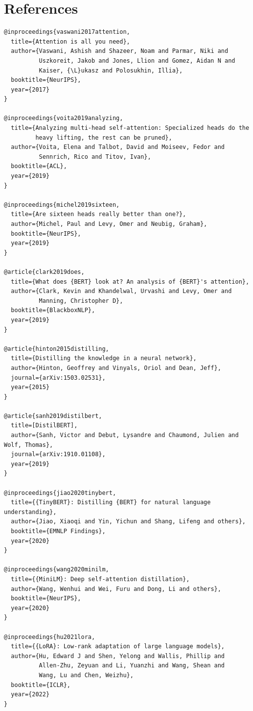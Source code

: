\section{References}

\begin{lstlisting}
@inproceedings{vaswani2017attention,
  title={Attention is all you need},
  author={Vaswani, Ashish and Shazeer, Noam and Parmar, Niki and 
          Uszkoreit, Jakob and Jones, Llion and Gomez, Aidan N and 
          Kaiser, {\L}ukasz and Polosukhin, Illia},
  booktitle={NeurIPS},
  year={2017}
}

@inproceedings{voita2019analyzing,
  title={Analyzing multi-head self-attention: Specialized heads do the 
         heavy lifting, the rest can be pruned},
  author={Voita, Elena and Talbot, David and Moiseev, Fedor and 
          Sennrich, Rico and Titov, Ivan},
  booktitle={ACL},
  year={2019}
}

@inproceedings{michel2019sixteen,
  title={Are sixteen heads really better than one?},
  author={Michel, Paul and Levy, Omer and Neubig, Graham},
  booktitle={NeurIPS},
  year={2019}
}

@article{clark2019does,
  title={What does {BERT} look at? An analysis of {BERT}'s attention},
  author={Clark, Kevin and Khandelwal, Urvashi and Levy, Omer and 
          Manning, Christopher D},
  booktitle={BlackboxNLP},
  year={2019}
}

@article{hinton2015distilling,
  title={Distilling the knowledge in a neural network},
  author={Hinton, Geoffrey and Vinyals, Oriol and Dean, Jeff},
  journal={arXiv:1503.02531},
  year={2015}
}

@article{sanh2019distilbert,
  title=[DistilBERT],
  author={Sanh, Victor and Debut, Lysandre and Chaumond, Julien and Wolf, Thomas},
  journal={arXiv:1910.01108},
  year={2019}
}

@inproceedings{jiao2020tinybert,
  title={{TinyBERT}: Distilling {BERT} for natural language understanding},
  author={Jiao, Xiaoqi and Yin, Yichun and Shang, Lifeng and others},
  booktitle={EMNLP Findings},
  year={2020}
}

@inproceedings{wang2020minilm,
  title={{MiniLM}: Deep self-attention distillation},
  author={Wang, Wenhui and Wei, Furu and Dong, Li and others},
  booktitle={NeurIPS},
  year={2020}
}

@inproceedings{hu2021lora,
  title={{LoRA}: Low-rank adaptation of large language models},
  author={Hu, Edward J and Shen, Yelong and Wallis, Phillip and 
          Allen-Zhu, Zeyuan and Li, Yuanzhi and Wang, Shean and 
          Wang, Lu and Chen, Weizhu},
  booktitle={ICLR},
  year={2022}
}


\end{lstlisting}
